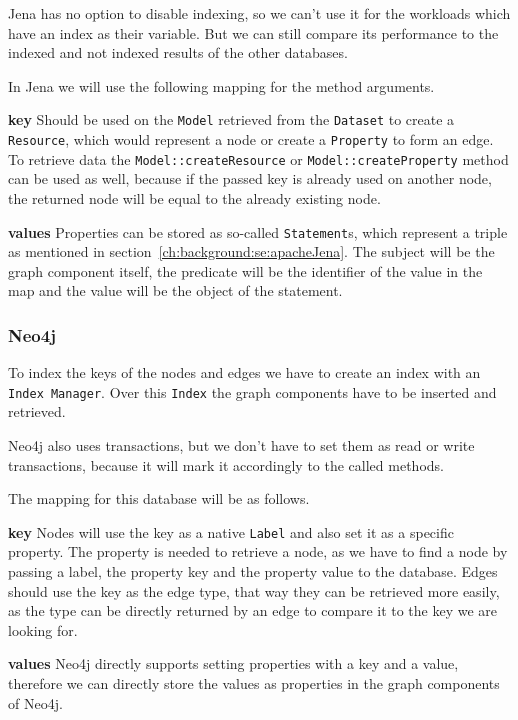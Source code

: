Jena has no option to disable indexing,
so we can't use it for the workloads which have an index as their variable.
But we can still compare its performance to the indexed and not indexed results of the other databases.

In Jena we will use the following mapping for the method arguments.

\textbf{key} \newline
Should be used on the \texttt{Model} retrieved from the \texttt{Dataset} to create a \texttt{Resource},
which would represent a node or create a \texttt{Property} to form an edge.
To retrieve data the \texttt{Model::createResource} or \texttt{Model::createProperty} method can be used as well,
because if the passed key is already used on another node,
the returned node will be equal to the already existing node.

\textbf{values} \newline
Properties can be stored as so-called \texttt{Statement}s,
which represent a triple as mentioned in section~\ref{ch:background:se:apacheJena}.
The subject will be the graph component itself,
the predicate will be the identifier of the value in the map and the value will be the object of the statement.

\subsubsection{Neo4j}
To index the keys of the nodes and edges we have to create an index with an \texttt{Index Manager}.
Over this \texttt{Index} the graph components have to be inserted and retrieved.

Neo4j also uses transactions,
but we don't have to set them as read or write transactions,
because it will mark it accordingly to the called methods.

The mapping for this database will be as follows.

\textbf{key} \newline
Nodes will use the key as a native \texttt{Label} and also set it as a specific property.
The property is needed to retrieve a node,
as we have to find a node by passing a label,
the property key and the property value to the database.
Edges should use the key as the edge type,
that way they can be retrieved more easily,
as the type can be directly returned by an edge to compare it to the key we are looking for.

\textbf{values} \newline
Neo4j directly supports setting properties with a key and a value,
therefore we can directly store the values as properties in the graph components of Neo4j.

